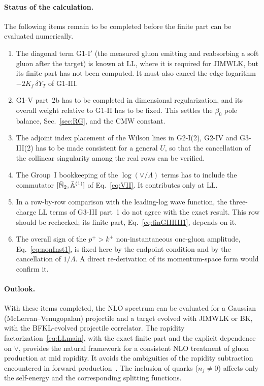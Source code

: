 \paragraph*{Status of the calculation.} The following items remain to be completed before the finite part can be evaluated numerically.
\begin{enumerate}
\item The diagonal term G1-I$'$ (the measured gluon emitting and reabsorbing a soft gluon after the target) is known at LL, where it is required for JIMWLK, but its finite part has not been computed. It must also cancel the edge logarithm $-2K_f\,\delta Y_T$ of G1-III.
\item G1-V part~2b has to be completed in dimensional regularization, and its overall weight relative to G1-II has to be fixed. This settles the $\beta_0$ pole balance, Sec.~\ref{sec:RG}, and the CMW constant.
\item The adjoint index placement of the Wilson lines in G2-I(2), G2-IV and G3-III(2) has to be made consistent for a general $U$, so that the cancellation of the collinear singularity among the real rows can be verified.
\item The Group~I bookkeeping of the $\log(\vee/\Lambda)$ terms has to include the commutator $[\bar{\mathbb{N}}_2,\bar{\mathbb{A}}^{(1)}]$ of Eq.~\eqref{eq:VII}. It contributes only at LL.
\item In a row-by-row comparison with the leading-log wave function, the three-charge LL terms of G3-III part~1 do not agree with the exact result. This row should be rechecked; its finite part, Eq.~\eqref{eq:finGIIIIII1}, depends on it.
\item The overall sign of the $p^+>k^+$ non-instantaneous one-gluon amplitude, Eq.~\eqref{eq:nonInst1}, is fixed here by the endpoint condition and by the cancellation of $1/\Lambda$. A direct re-derivation of its momentum-space form would confirm it.
\end{enumerate}

\paragraph*{Outlook.} With these items completed, the NLO spectrum can be evaluated for a Gaussian (McLerran--Venugopalan) projectile and a target evolved with JIMWLK or BK, with the BFKL-evolved projectile correlator. The rapidity factorization~\eqref{eq:LLmain}, with the exact finite part and the explicit dependence on $\vee$, provides the natural framework for a consistent NLO treatment of gluon production at mid rapidity. It avoids the ambiguities of the rapidity subtraction encountered in forward production~\cite{Stasto:2013cha,Ducloue:2016shw,Iancu:2016vyg}. The inclusion of quarks ($n_f\neq0$) affects only the self-energy and the corresponding splitting functions.

\begin{acknowledgments}
\end{acknowledgments}
